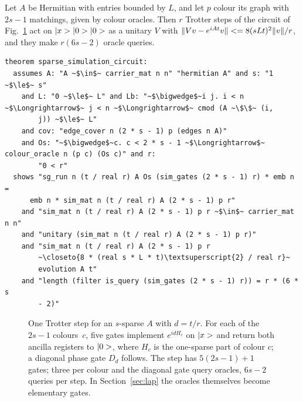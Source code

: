 \begin{theorem}\label{thm:sparse}
Let $A$ be Hermitian with entries bounded by $L$, and let $p$ colour its graph with $2s-1$ matchings,
given by colour oracles. Then $r$ Trotter steps of the circuit of Fig.~\ref{fig:sparse} act on
$|x>|0>|0>$ as a unitary $V$ with $\|Vv-e^{iAt}v\|<=8(sLt)^2\|v\|/r$, and they make
$r(6s-2)$ oracle queries.
\end{theorem}

\begin{lstlisting}[float=tp,caption={Theorem~\ref{thm:sparse}: the gate list \isa{sim\_gates} runs as \isa{sim\_mat}, which is $8(sLt)^2/r$-close to the evolution, with $r(6s-2)$ queries},label={lst:sparse}]
theorem sparse_simulation_circuit:
  assumes A: "A ~$\in$~ carrier_mat n n" "hermitian A" and s: "1 ~$\le$~ s"
    and L: "0 ~$\le$~ L" and Lb: "~$\bigwedge$~i j. i < n ~$\Longrightarrow$~ j < n ~$\Longrightarrow$~ cmod (A ~\$\$~ (i,
        j)) ~$\le$~ L"
    and cov: "edge_cover n (2 * s - 1) p (edges n A)"
    and Os: "~$\bigwedge$~c. c < 2 * s - 1 ~$\Longrightarrow$~ colour_oracle n (p c) (Os c)" and r:
        "0 < r"
  shows "sg_run n (t / real r) A Os (sim_gates (2 * s - 1) r) * emb n =
      emb n * sim_mat n (t / real r) A (2 * s - 1) p r"
    and "sim_mat n (t / real r) A (2 * s - 1) p r ~$\in$~ carrier_mat n n"
    and "unitary (sim_mat n (t / real r) A (2 * s - 1) p r)"
    and "sim_mat n (t / real r) A (2 * s - 1) p r
        ~\closeto{8 * (real s * L * t)\textsuperscript{2} / real r}~
        evolution A t"
    and "length (filter is_query (sim_gates (2 * s - 1) r)) = r * (6 * s
        - 2)"
\end{lstlisting}

\begin{figure}[t]
\centering
{}
\caption{One Trotter step for an $s$-sparse $A$ with $d=t/r$. For each of the $2s-1$ colours~$c$, five
gates implement $e^{idH_c}$ on $|x>$ and return both ancilla registers to $|0>$, where $H_c$ is the
one-sparse part of colour $c$; a diagonal phase gate $D_d$ follows. The step has $5(2s-1)+1$ gates; three per colour and the diagonal gate query
oracles, $6s-2$ queries per step. In Section~\ref{sec:lap} the oracles themselves become elementary
gates.}\label{fig:sparse}
\end{figure}


